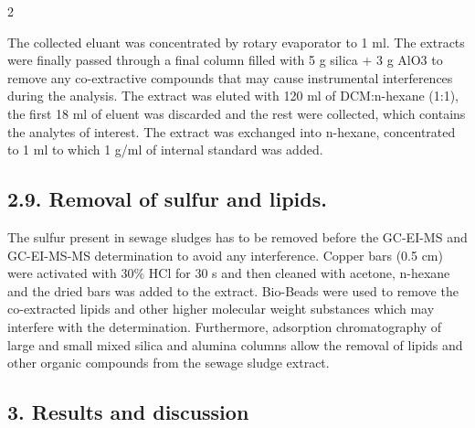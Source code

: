 \documentclass{article}
\begin{document}
\sloppy

\begin{paracol}{2}
\RaggedRight

The collected eluant was concentrated by rotary evaporator to 1 ml. The extracts were finally passed through a
final column filled with 5 g silica + 3 g AlO3 to remove any
co-extractive compounds that may cause instrumental interferences during the analysis. The extract was eluted with
120 ml of DCM:n-hexane (1:1), the first 18 ml of eluent was
discarded and the rest were collected, which contains the analytes of interest. The extract was exchanged into n-hexane,
concentrated to 1 ml to which 1 g/ml of internal standard
was added.


\subsection*{2.9. Removal of sulfur and lipids.}


The sulfur present in sewage sludges has to be removed
before the GC-EI-MS and GC-EI-MS-MS determination to
avoid any interference.
Copper bars (0.5 cm) were activated with 30\% HCl for
30 s and then cleaned with acetone, n-hexane and the dried
bars was added to the extract. Bio-Beads were used to remove
the co-extracted lipids and other higher molecular weight
substances which may interfere with the determination.
Furthermore, adsorption chromatography of large and small
mixed silica and alumina columns allow the removal of
lipids and other organic compounds from the sewage sludge
extract.


\subsection*{3. Results and discussion}



\end{paracol}
\end{document}
